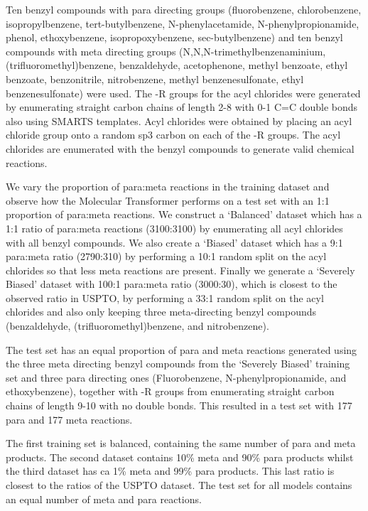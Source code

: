 Ten benzyl compounds with para directing groups (fluorobenzene, chlorobenzene, isopropylbenzene, tert-butyl\-benzene, N-phenylacetamide, N-phenylpropionamide, phenol, ethoxybenzene, isopropoxybenzene, sec-butyl\-benzene) and ten benzyl compounds with meta directing groups (N,N,N-trimethylbenzenaminium, (trifluoromethyl)benzene, benzaldehyde, acetophenone, methyl benzoate, ethyl benzoate, benzonitrile, nitrobenzene, methyl benzenesulfonate, ethyl benzenesulfonate) were used. The -R groups for the acyl chlorides were generated by enumerating straight carbon chains of length 2-8 with 0-1 C=C double bonds also using SMARTS templates. Acyl chlorides were obtained by placing an acyl chloride group onto a random sp3 carbon on each of the -R groups. The acyl chlorides are enumerated with the benzyl compounds to generate valid chemical reactions. 

We vary the proportion of para:meta reactions in the training dataset and observe how the Molecular Transformer performs on a test set with an 1:1 proportion of para:meta reactions. We construct a `Balanced' dataset which has a 1:1 ratio of para:meta reactions (3100:3100) by enumerating all acyl chlorides with all benzyl compounds.  We also create a `Biased' dataset which has a 9:1 para:meta ratio (2790:310) by performing a 10:1 random split on the acyl chlorides so that less meta reactions are present. Finally we generate a `Severely Biased' dataset with 100:1 para:meta ratio (3000:30), which is closest to the observed ratio in USPTO, by performing a 33:1 random split on the acyl chlorides and also only keeping three meta-directing benzyl compounds (benzaldehyde, (trifluoromethyl)benzene, and nitrobenzene).

The test set has an equal proportion of para and meta reactions generated using the three meta directing benzyl compounds from the `Severely Biased' training set and three para directing ones (Fluorobenzene, N-phenylpropionamide, and ethoxybenzene), together with -R groups from enumerating straight carbon chains of length 9-10 with no double bonds. This resulted in a test set with 177 para and 177 meta reactions.

The first training set is balanced, containing the same number of para and meta products. The second dataset contains 10\% meta and 90\% para products whilst the third dataset has ca 1\% meta and 99\% para products. This last ratio is closest to the ratios of the USPTO dataset. The test set for all models contains an equal number of meta and para reactions. 

